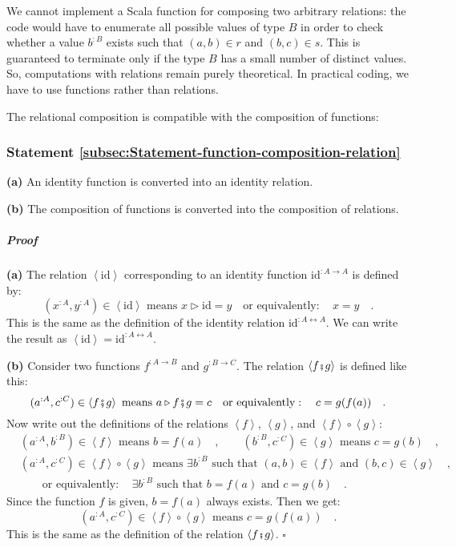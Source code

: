 We cannot implement a Scala function for composing two arbitrary relations:
the code would have to enumerate all possible values of type $B$
in order to check whether a value $b^{:B}$ exists such that $(a,b)\in r$
and $(b,c)\in s$. This is guaranteed to terminate only if the type
$B$ has a small number of distinct values. So, computations with
relations remain purely theoretical. In practical coding, we have
to use functions rather than relations.

The relational composition is compatible with the composition of functions:

\subsubsection{Statement \label{subsec:Statement-function-composition-relation}\ref{subsec:Statement-function-composition-relation}}

\textbf{(a)} An identity function is converted into an identity relation.

\textbf{(b)} The composition of functions is converted into the composition
of relations.

\subparagraph{Proof}

\textbf{(a)} The relation $\left<\text{id}\right>$ corresponding
to an identity function $\text{id}^{:A\rightarrow A}$ is defined
by:
\[
(x^{:A},y^{:A})\in\left<\text{id}\right>\text{ means }x\triangleright\text{id}=y\quad\text{or equivalently}:\quad x=y\quad.
\]
This is the same as the definition of the identity relation $\text{id}^{:A\leftrightarrow A}$.
We can write the result as $\left<\text{id}\right>=\text{id}^{:A\leftrightarrow A}$.

\textbf{(b)} Consider two functions $f^{:A\rightarrow B}$ and $g^{:B\rightarrow C}$.
The relation $\left<f\bef g\right>$ is defined like this:
\[
(a^{:A},c^{:C})\in\left<f\bef g\right>\text{ means }a\triangleright f\bef g=c\quad\text{or equivalently}:\quad c=g(f(a))\quad.
\]
Now write out the definitions of the relations $\left<f\right>$,
$\left<g\right>$, and $\left<f\right>\circ\left<g\right>$:
\begin{align*}
 & (a^{:A},b^{:B})\in\left<f\right>\text{ means }b=f(a)\quad,\quad\quad(b^{:B},c^{:C})\in\left<g\right>\text{ means }c=g(b)\quad,\\
 & (a^{:A},c^{:C})\in\left<f\right>\circ\left<g\right>\text{ means }\exists b^{:B}\text{ such that }(a,b)\in\left<f\right>\text{ and }(b,c)\in\left<g\right>\quad,\\
 & \quad\quad\text{or equivalently}:\quad\exists b^{:B}\text{ such that }b=f(a)\text{ and }c=g(b)\quad.
\end{align*}
Since the function $f$ is given, $b=f(a)$ always exists. Then we
get:
\[
(a^{:A},c^{:C})\in\left<f\right>\circ\left<g\right>\text{ means }c=g(f(a))\quad.
\]
This is the same as the definition of the relation $\left<f\bef g\right>$.
$\square$

